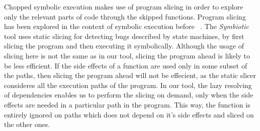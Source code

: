 Chopped symbolic execution makes use of program slicing in order to
explore only the relevant parts of code through the skipped functions.
Program slicing has been explored in the context of symbolic execution before ~\cite{babic11,slaby2013symbiotic}.
The \textit{Symbiotic}~\cite{slaby2013symbiotic} tool uses static slicing for
detecting bugs described by state machines,
by first slicing the program and then executing it symbolically.
Although the usage of slicing here is not the same as in our tool,
slicing the program ahead is likely to be less efficient.
If the side effects of a function are used only in some subset of the paths,
then slicing the program ahead will not be effecient,
as the static slicer consideres all the execution paths of the program.
In our tool, the lazy resolving of dependencies enables us to perform the slicing on demand,
only when the side effects are needed in a particular path in the program.
This way, the function is entirely ignored on paths which does not depend on it's side effects
and sliced on the other ones.

